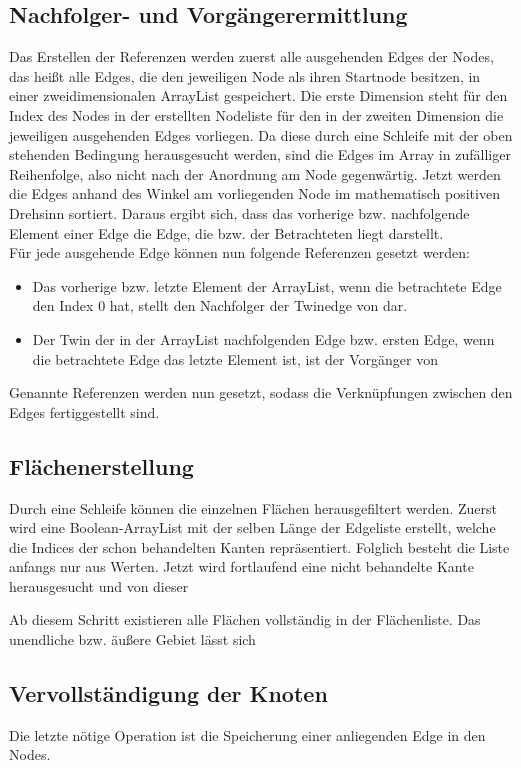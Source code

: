 \subsection{Nachfolger- und Vorgängerermittlung}
Das Erstellen der Referenzen werden zuerst alle ausgehenden Edges der Nodes, das heißt alle Edges, die den jeweiligen Node als ihren Startnode besitzen, in einer zweidimensionalen ArrayList gespeichert.
Die erste Dimension steht für den Index des Nodes in der erstellten Nodeliste für den in der zweiten Dimension die jeweiligen ausgehenden Edges vorliegen.
Da diese durch eine  Schleife mit der oben stehenden Bedingung herausgesucht werden, sind die Edges im Array in zufälliger Reihenfolge, also nicht nach der Anordnung am Node gegenwärtig.
Jetzt werden die Edges anhand des  Winkel am vorliegenden Node im mathematisch positiven Drehsinn sortiert.
Daraus ergibt sich, dass das vorherige bzw. nachfolgende Element einer Edge die Edge, die  bzw.  der Betrachteten liegt darstellt.\\
Für jede ausgehende Edge  können nun folgende Referenzen gesetzt werden:
\begin{itemize}
	\item Das vorherige bzw. letzte Element der ArrayList, wenn die betrachtete Edge den Index 0 hat, stellt den Nachfolger der Twinedge von  dar.
	\item Der Twin der in der ArrayList nachfolgenden Edge bzw. ersten Edge, wenn die betrachtete Edge das letzte Element ist, ist der Vorgänger von 
\end{itemize}
Genannte Referenzen werden nun gesetzt, sodass die Verknüpfungen zwischen den Edges fertiggestellt sind.
\subsection{Flächenerstellung}
Durch eine Schleife können die einzelnen Flächen herausgefiltert werden.
Zuerst wird eine Boolean-ArrayList mit der selben Länge der Edgeliste erstellt, welche die Indices der schon behandelten Kanten repräsentiert.
Folglich besteht die Liste anfangs nur aus  Werten.
Jetzt wird fortlaufend eine nicht behandelte Kante herausgesucht und von dieser   

Ab diesem Schritt existieren alle Flächen vollständig in der Flächenliste.
Das unendliche bzw. äußere Gebiet lässt sich 


\subsection{Vervollständigung der Knoten}
Die letzte nötige Operation ist die Speicherung einer anliegenden Edge in den Nodes.